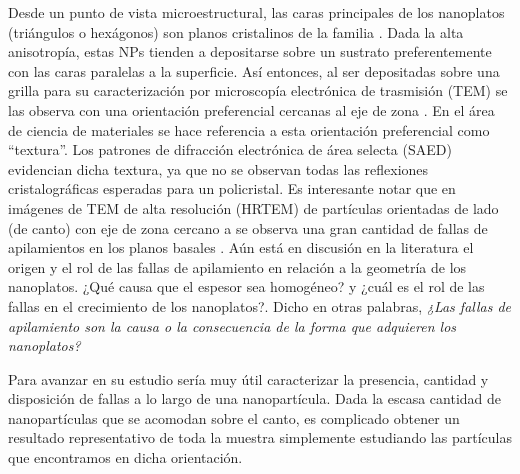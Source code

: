 Desde un punto de vista microestructural, las caras principales de los nanoplatos (triángulos o hexágonos) son planos cristalinos de la familia . Dada la alta anisotropía, estas NPs tienden a depositarse sobre un sustrato preferentemente con las caras  paralelas a la superficie. Así entonces, al ser depositadas sobre una grilla para su caracterización por microscopía electrónica de trasmisión (TEM) se las observa con una orientación preferencial cercanas al eje de zona \hkl[111]. En el área de ciencia de materiales se hace referencia a esta orientación preferencial como ``textura''. Los patrones de difracción electrónica de área selecta (SAED) evidencian dicha textura, ya que no se observan todas las reflexiones cristalográficas esperadas para un policristal. Es interesante notar que en imágenes de TEM de alta resolución (HRTEM) de partículas orientadas de lado (de canto) con eje de zona cercano a \hkl[110] se observa una gran cantidad de fallas de apilamientos en los planos basales .\cite{tan2021} Aún está en discusión en la literatura el origen y el rol de las fallas de apilamiento en relación a la geometría de los nanoplatos. ¿Qué causa que el espesor sea homogéneo? y ¿cuál es el rol de las fallas en el crecimiento de los nanoplatos?. Dicho en otras palabras, \textit{¿Las fallas de apilamiento son la causa o la consecuencia de la forma que adquieren los nanoplatos?}

Para avanzar en su estudio sería muy útil caracterizar la presencia, cantidad y disposición de fallas a lo largo de una nanopartícula. 
Dada la escasa cantidad de nanopartículas que se acomodan sobre el canto, es complicado obtener un resultado representativo de toda la muestra simplemente estudiando las partículas que encontramos en dicha orientación.%

